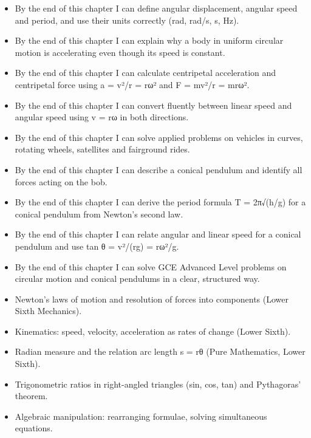 \documentclass[11pt]{article}
\begin{document}
\begin{objectifs}
\begin{itemize}
\item By the end of this chapter I can define angular displacement, angular speed and period, and use their units correctly (rad, rad/s, s, Hz).
\item By the end of this chapter I can explain why a body in uniform circular motion is accelerating even though its speed is constant.
\item By the end of this chapter I can calculate centripetal acceleration and centripetal force using a = v²/r = rω² and F = mv²/r = mrω².
\item By the end of this chapter I can convert fluently between linear speed and angular speed using v = rω in both directions.
\item By the end of this chapter I can solve applied problems on vehicles in curves, rotating wheels, satellites and fairground rides.
\item By the end of this chapter I can describe a conical pendulum and identify all forces acting on the bob.
\item By the end of this chapter I can derive the period formula T = 2π√(h/g) for a conical pendulum from Newton's second law.
\item By the end of this chapter I can relate angular and linear speed for a conical pendulum and use tan θ = v²/(rg) = rω²/g.
\item By the end of this chapter I can solve GCE Advanced Level problems on circular motion and conical pendulums in a clear, structured way.
\end{itemize}
\end{objectifs}

\begin{prerequis}
\begin{itemize}
\item Newton's laws of motion and resolution of forces into components (Lower Sixth Mechanics).
\item Kinematics: speed, velocity, acceleration as rates of change (Lower Sixth).
\item Radian measure and the relation arc length s = rθ (Pure Mathematics, Lower Sixth).
\item Trigonometric ratios in right-angled triangles (sin, cos, tan) and Pythagoras' theorem.
\item Algebraic manipulation: rearranging formulae, solving simultaneous equations.
\end{itemize}
\end{prerequis}
\end{document}
